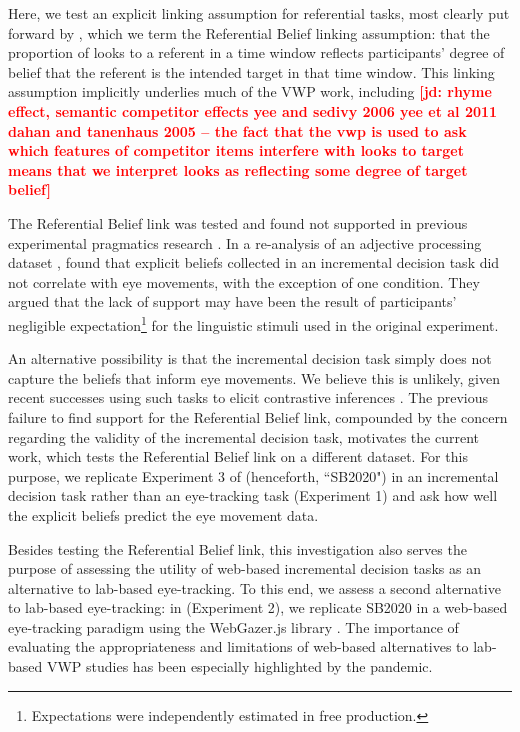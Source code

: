 \documentclass[10pt,letterpaper]{article}
\newcommand{\expref}[1]{Experiment #1}
\newcommand{\jd}[1]{\textcolor{Red}{\textbf{[jd: #1]}}}
\begin{document}
Here, we test an explicit linking assumption for referential tasks, most clearly put forward by , which we term the Referential Belief linking assumption: that the proportion of looks to a referent in a time window reflects participants' degree of belief that the referent is the intended target in that time window. This linking assumption implicitly underlies much of the VWP work, including \jd{rhyme effect, semantic competitor effects yee and sedivy 2006 yee et al 2011 dahan and tanenhaus 2005 -- the fact that the vwp is used to ask which features of competitor items interfere with looks to target means that we interpret looks as reflecting some degree of target belief}

The Referential Belief link was  tested and found not supported in previous experimental pragmatics research  \cite{QingLD2018}. In a re-analysis of an adjective processing dataset \cite{LeffelXiangKennedy2016:Imprecision-is-Pragmatic-},  found that explicit beliefs collected in an incremental decision task \cite<similar to gating tasks,>{Allopenna1998} did not correlate with eye movements, with the exception of one condition. They argued that the lack of support may have been the result of participants' negligible expectation\footnote{Expectations were independently estimated in free production.}  for  the  linguistic stimuli used in the original experiment.  

An alternative possibility is that the incremental decision task simply does not capture the beliefs that inform eye movements. We believe this is unlikely, given recent successes  using such tasks to elicit contrastive inferences \cite{KreissDegen2020, alsop2018}. The previous failure to find support for the Referential Belief link, compounded by the concern regarding the validity of the incremental decision task, motivates the current work, which tests the Referential Belief link on a different dataset. For this purpose, we replicate \expref{3} of  (henceforth, ``SB2020") in an incremental decision task rather than an eye-tracking task (\expref{1}) and ask how well the explicit beliefs predict the eye movement data. 


Besides testing the Referential Belief link, this investigation also serves the purpose of assessing the utility of web-based incremental decision tasks as an alternative to lab-based eye-tracking. To this end, we assess a second alternative to lab-based eye-tracking: in   (\expref{2}), we replicate SB2020 in a web-based eye-tracking paradigm using the WebGazer.js library \cite{papoutsaki2016webgazer}. The importance of evaluating the appropriateness and limitations of web-based alternatives to lab-based VWP studies has been especially highlighted by the pandemic.  
\end{document}
